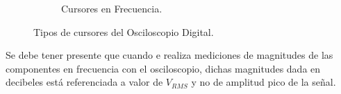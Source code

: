 \begin{figure}[H]
\begin{subfigure}[H]{0.45\textwidth}
                \caption{Cursores en Frecuencia.}
                \label{fig:CursorFrec}
                \end{subfigure}
                \caption{Tipos de cursores del Osciloscopio Digital.}
                \label{fig:CursorTipos}
            \end{figure}

        Se debe tener presente que cuando e realiza mediciones de magnitudes de las 
        componentes en frecuencia con el osciloscopio, dichas magnitudes dada en 
        decibeles está referenciada a valor de \(V_{RMS}\) y no de amplitud pico de la señal.
                
    

    



